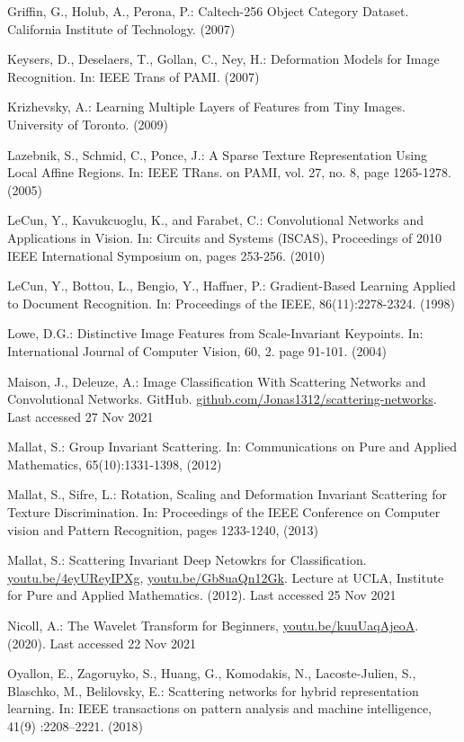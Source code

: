 \documentclass[runningheads]{llncs}
\begin{document}
\begin{thebibliography}{8}
Griffin, G., Holub, A., Perona, P.: Caltech-256 Object Category Dataset. California Institute of Technology. (2007)

Keysers, D., Deselaers, T., Gollan, C., Ney, H.: Deformation Models for Image Recognition. In: IEEE Trans of PAMI. (2007)

Krizhevsky, A.: Learning Multiple Layers of Features from Tiny Images. University of Toronto. (2009)

Lazebnik, S., Schmid, C., Ponce, J.: A Sparse Texture Representation Using Local Affine Regions. In: IEEE TRans. on PAMI, vol. 27, no. 8, page 1265-1278. (2005)

LeCun, Y., Kavukcuoglu, K., and Farabet, C.: Convolutional Networks and Applications in Vision. In: Circuits and Systems (ISCAS), Proceedings of 2010 IEEE International Symposium on, pages 253-256. (2010)

LeCun, Y., Bottou, L., Bengio, Y., Haffner, P.: Gradient-Based Learning Applied to Document Recognition. In: Proceedings of the IEEE, 86(11):2278-2324. (1998)

Lowe, D.G.: Distinctive Image Features from Scale-Invariant Keypoints. In: International Journal of Computer Vision, 60, 2.  page 91-101. (2004)

Maison, J., Deleuze, A.: Image Classification With Scattering Networks and Convolutional Networks. GitHub. \url{github.com/Jonas1312/scattering-networks}. Last accessed 27 Nov 2021

Mallat, S.: Group Invariant Scattering. In: Communications on Pure and Applied Mathematics, 65(10):1331-1398, (2012)

Mallat, S., Sifre, L.: Rotation, Scaling and Deformation Invariant Scattering for Texture Discrimination. In: Proceedings of the IEEE Conference on Computer vision and Pattern Recognition, pages 1233-1240, (2013)

Mallat, S.: Scattering Invariant Deep Netowkrs for Classification. \url{youtu.be/4eyUReyIPXg}, \url{youtu.be/Gb8uaQn12Gk}. Lecture at UCLA, Institute for Pure and Applied Mathematics. (2012). Last accessed 25 Nov 2021

Nicoll, A.: The Wavelet Transform for Beginners, \url{youtu.be/kuuUaqAjeoA}. (2020). Last accessed 22 Nov 2021

Oyallon, E., Zagoruyko, S., Huang, G., Komodakis, N., Lacoste-Julien, S., Blaschko, M., Belilovsky, E.: Scattering networks for hybrid representation learning. In: IEEE transactions on pattern analysis and machine intelligence, 41(9) :2208–2221. (2018)


\end{thebibliography}
\end{document}
